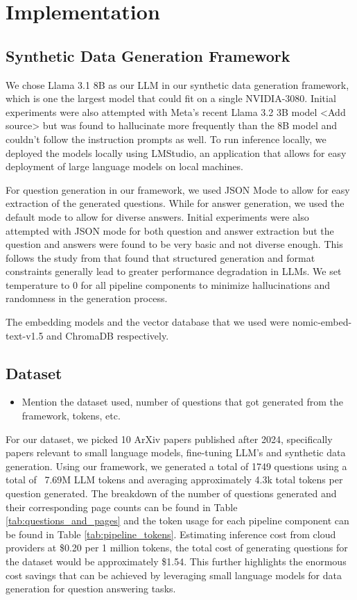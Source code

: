 \section{Implementation}\label{sec:implementation}


\subsection{Synthetic Data Generation Framework}

We chose Llama 3.1 8B as our LLM in our synthetic data generation framework, which is one the largest model that could fit on a single NVIDIA-3080. Initial experiments
were also attempted with Meta's recent Llama 3.2 3B model <Add source> but was found to hallucinate more frequently than the 8B model and couldn't follow the instruction prompts as well.
To run inference locally, we deployed the models locally using LMStudio, an application that allows for easy deployment of large language models on local machines.

For question generation in our framework, we used JSON Mode to allow for easy extraction of the generated questions. While for answer generation, we used the default
mode to allow for diverse answers. Initial experiments were also attempted with JSON mode for both question and answer extraction but the question and answers
were found to be very basic and not diverse enough. This follows the study from \cite{tam2024letspeakfreelystudy} that found that structured generation and format constraints
generally lead to greater performance degradation in LLMs. We set temperature to 0 for all pipeline components to minimize hallucinations and randomness in the generation process.

The embedding models and the vector database that we used were nomic-embed-text-v1.5 and ChromaDB respectively.

\subsection{Dataset}

\begin{itemize}
   \item Mention the dataset used, number of questions that got generated from the framework, tokens, etc.
\end{itemize}
For our dataset, we picked 10 ArXiv papers published after 2024, specifically papers relevant to small language models, fine-tuning LLM's and synthetic data generation. 
Using our framework, we generated a total of 1749 questions using a total of ~7.69M LLM tokens and averaging approximately 4.3k total tokens per question generated. 
The breakdown of the number of questions generated and their corresponding page counts can be found in Table \ref{tab:questions_and_pages} and the token usage 
for each pipeline component can be found in Table \ref{tab:pipeline_tokens}. Estimating inference cost from cloud providers at \$0.20 per 1 million tokens, 
the total cost of generating questions for the dataset would be approximately \$1.54. This further highlights the enormous cost savings that can be achieved 
by leveraging small language models for data generation for question answering tasks.

